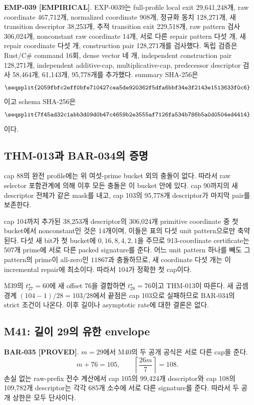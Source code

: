 \documentclass[11pt]{article}
\newcommand{\claimstatus}[2]{\textbf{#1 [#2]}}
\begin{document}
\claimstatus{EMP-039}{EMPIRICAL}.
EXP-0039는 full-profile local exit 29,641,248개, raw coordinate
467,712개, normalized coordinate 908개, 정규화 동치 128,271개,
새 transition descriptor 38,253개, 추적 transition exit 229,518개,
raw pattern 검사 306,024개, nonconstant raw coordinate 14개,
서로 다른 repair pattern 다섯 개, 새 repair coordinate 다섯 개,
construction pair 128,271개를 검사했다. 독립 검증은 Rust/C\# command
16회, dense vector 네 개, independent construction pair 128,271개,
independent additive-cap, multiplicative-cap, predecessor descriptor
검사 58,464개, 61,143개, 95,778개를 추가했다. summary SHA-256은
\[
\texttt{\seqsplit{2059fbfc2eff0bfe710427cea5de920362f5dfa6bbf34e3f2143e1513633f0c6}}
\]
이고 schema SHA-256은
\[
\texttt{\seqsplit{7f45ad32c1abb3d09d0b47c4659b2e3555af7126fa534b786b5a0d0504ed4414}}
\]
이다.

\subsection{THM-013과 BAR-034의 증명}

cap 88의 완전 profile에는 위 여섯-prime bucket 외의 충돌이 없다.
따라서 raw selector 포함관계에 의해 이후 모든 충돌은 이 bucket
안에 있다. cap 90까지의 새 descriptor 전체가 같은 mask를 내고,
cap 103의 95,778개 descriptor가 마지막 pair를 보존한다.

cap 104까지 추가된 38,253개 descriptor의 306,024개 primitive
coordinate 중 첫 bucket에서 nonconstant인 것은 14개이며, 이들은
표의 다섯 unit pattern으로만 축약된다. 다섯 새 bit가 첫 bucket에
\(0,16,8,4,2,1\)을 주므로 913-coordinate certificate는 507개
prime에 서로 다른 packed signature를 준다. 어느 unit pattern
하나를 빼도 그 pattern의 prime이 all-zero인 \(11867\)과
충돌하므로, 새 coordinate 다섯 개는 이 incremental repair에
최소이다. 따라서 104가 정확한 첫 cap이다.

M39의 \(t_{27}^\star=60\)에 새 offset 76을 결합하면
\(t_{28}^\star=76\)이고 THM-013이 따른다. 새 곱셈 경계
\((104-1)/28=103/28\)에서 끝점은 cap 103으로 실패하므로 BAR-034의
strict 조건이 나온다. 이후 길이나 asymptotic rate에 대한 결론은
없다.

\subsection{M41: 길이 29의 유한 envelope}

\claimstatus{BAR-035}{PROVED}.
\(m=29\)에서 M40의 두 공개 공식은 서로 다른 cap을 준다.
\[
m+76=105,\qquad
\left\lceil\frac{26m}{7}\right\rceil=108.
\]
손실 없는 raw-prefix 전수 계산에서 cap 105의 99,424개 descriptor와
cap 108의 109,782개 descriptor는 각각 685개 소수에 서로 다른
signature를 준다. 따라서 두 공개 상한은 모두 단사이다.
\end{document}
